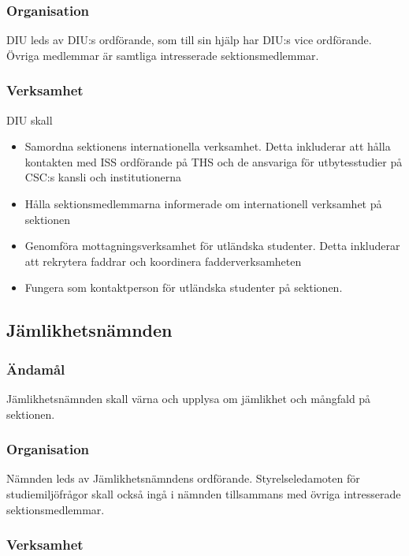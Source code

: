 \documentclass{dgovdoc}
\begin{document}
\subsubsection{Organisation}

DIU leds av DIU:s ordförande, som till sin hjälp har DIU:s vice ordförande.
Övriga medlemmar är samtliga intresserade sektionsmedlemmar.

\subsubsection{Verksamhet}

DIU skall

\begin{itemize}
  \item Samordna sektionens internationella verksamhet. Detta inkluderar att
    hålla kontakten med ISS ordförande på THS och de ansvariga för
    utbytesstudier på CSC:s kansli och institutionerna
  \item Hålla sektionsmedlemmarna informerade om internationell verksamhet på
    sektionen
  \item Genomföra mottagningsverksamhet för utländska studenter. Detta
    inkluderar att rekrytera faddrar och koordinera fadderverksamheten
  \item Fungera som kontaktperson för utländska studenter på sektionen.
\end{itemize}

\subsection{Jämlikhetsnämnden}

\subsubsection{Ändamål}

Jämlikhetsnämnden skall värna och upplysa om jämlikhet och mångfald på
sektionen.

\subsubsection{Organisation}

Nämnden leds av Jämlikhetsnämndens ordförande. Styrelseledamoten för
studiemiljöfrågor skall också ingå i nämnden tillsammans med övriga
intresserade sektionsmedlemmar.

\subsubsection{Verksamhet}
\end{document}
